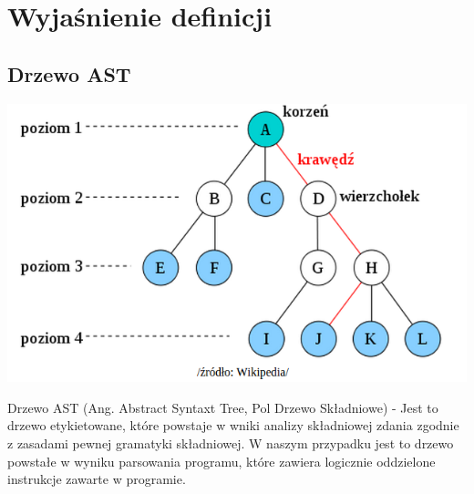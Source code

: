 \documentclass[a4paper,twoside,openright,11pt]{report}
\begin{document}
  
  \section {Wyjaśnienie definicji}

  \subsection {Drzewo AST}
\begin{center}
  \includegraphics[width=\textwidth]{ast}
\end{center}
  
\par Drzewo AST (Ang. Abstract Syntaxt Tree, Pol Drzewo Składniowe) - Jest to drzewo etykietowane, które powstaje w wniki analizy składniowej zdania zgodnie z zasadami pewnej gramatyki składniowej. W naszym przypadku jest to drzewo powstałe w wyniku parsowania programu, które zawiera logicznie oddzielone instrukcje zawarte w programie.
\end{document}

